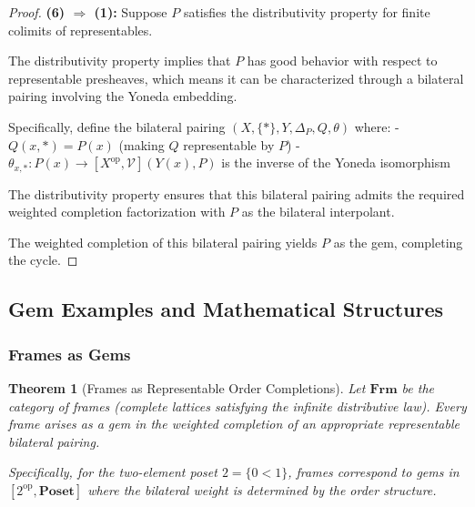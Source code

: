\documentclass[11pt]{article}
\theoremstyle{plain}
\newtheorem{theorem}{Theorem}[section]
\theoremstyle{definition}
\theoremstyle{remark}
\newcommand{\V}{\mathcal{V}}
\newcommand{\op}{\mathrm{op}}
\begin{document}
\begin{proof}
\textbf{(6) $\Rightarrow$ (1):}
Suppose $P$ satisfies the distributivity property for finite colimits of representables.

The distributivity property implies that $P$ has good behavior with respect to representable presheaves, which means it can be characterized through a bilateral pairing involving the Yoneda embedding.

Specifically, define the bilateral pairing $(X, \{\ast\}, Y, \Delta_P, Q, \theta)$ where:
- $Q(x, \ast) = P(x)$ (making $Q$ representable by $P$)
- $\theta_{x,\ast} : P(x) \to [X^{\op}, \V](Y(x), P)$ is the inverse of the Yoneda isomorphism

The distributivity property ensures that this bilateral pairing admits the required weighted completion factorization with $P$ as the bilateral interpolant.

The weighted completion of this bilateral pairing yields $P$ as the gem, completing the cycle.
\end{proof}

\subsection{Gem Examples and Mathematical Structures}

\subsubsection{Frames as Gems}

\begin{theorem}[Frames as Representable Order Completions]\label{thm:frames-as-gems}
Let $\mathbf{Frm}$ be the category of frames (complete lattices satisfying the infinite distributive law). Every frame arises as a gem in the weighted completion of an appropriate representable bilateral pairing.

Specifically, for the two-element poset $2 = \{0 < 1\}$, frames correspond to gems in $[2^{\op}, \mathbf{Poset}]$ where the bilateral weight is determined by the order structure.
\end{theorem}
\end{document}
